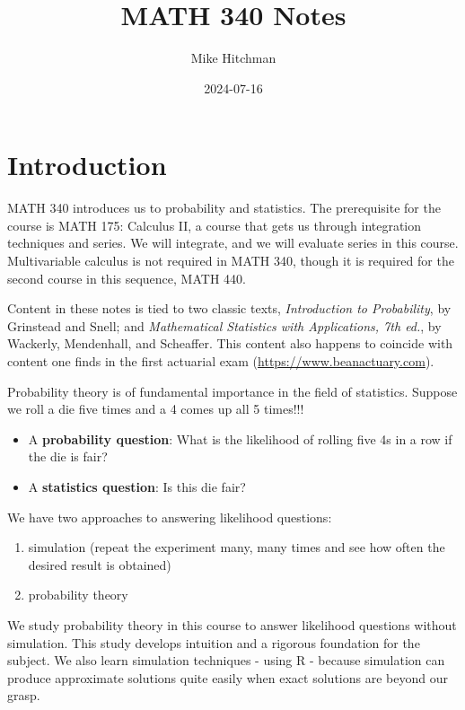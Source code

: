 \documentclass[
]{book}
\title{MATH 340 Notes}
\author{Mike Hitchman}
\date{2024-07-16}
\providecommand{\tightlist}{%
  \setlength{\itemsep}{0pt}\setlength{\parskip}{0pt}}
\theoremstyle{definition}
\theoremstyle{definition}
\theoremstyle{definition}
\theoremstyle{definition}
\theoremstyle{remark}
\begin{document}
\maketitle

{
\setcounter{tocdepth}{1}
\tableofcontents
}
\chapter{Introduction}\label{introduction}

MATH 340 introduces us to probability and statistics. The prerequisite for the course is MATH 175: Calculus II, a course that gets us through integration techniques and series. We will integrate, and we will evaluate series in this course. Multivariable calculus is not required in MATH 340, though it is required for the second course in this sequence, MATH 440.

Content in these notes is tied to two classic texts, \emph{Introduction to Probability}, by Grinstead and Snell; and \emph{Mathematical Statistics with Applications, 7th ed.}, by Wackerly, Mendenhall, and Scheaffer. This content also happens to coincide with content one finds in the first actuarial exam (\url{https://www.beanactuary.com}).

Probability theory is of fundamental importance in the field of statistics. Suppose we roll a die five times and a 4 comes up all 5 times!!!

\begin{itemize}
\tightlist
\item
  A \textbf{probability question}: What is the likelihood of rolling five 4s in a row if the die is fair?
\item
  A \textbf{statistics question}: Is this die fair?
\end{itemize}

We have two approaches to answering likelihood questions:

\begin{enumerate}
\def\labelenumi{\arabic{enumi}.}
\tightlist
\item
  simulation (repeat the experiment many, many times and see how often the desired result is obtained)
\item
  probability theory
\end{enumerate}

We study probability theory in this course to answer likelihood questions without simulation. This study develops intuition and a rigorous foundation for the subject. We also learn simulation techniques - using R - because simulation can produce approximate solutions quite easily when exact solutions are beyond our grasp.
\end{document}
